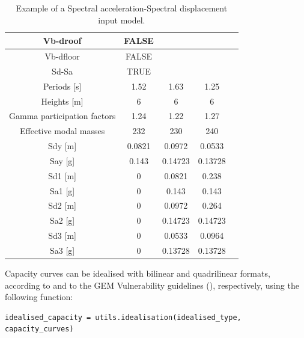 \begin {table}[htb]
\caption{Example of a Spectral acceleration-Spectral displacement input model.}
\label{table:Sa-Sd_input}
\begin{center}
  \begin{tabular}{ | c | c | c | c | c |}
  \hline
	Vb-droof &	FALSE & &  \\ \hline
	Vb-dfloor & 	FALSE & & \\ \hline
	Sd-Sa &	TRUE & & \\ \hline
	Periods [s] &	1.52 &	1.63 &	1.25 \\ \hline
	Heights [m]	& 6 &	6	& 6 \\ \hline
	Gamma participation factors	& 1.24 &	1.22 &	1.27 \\ \hline
	Effective modal masses	& 232 &	230 &	240 \\ \hline
	Sdy [m] & 	0.0821 & 	0.0972 &	0.0533\\ \hline
	Say [g]	& 0.143	& 0.14723	& 0.13728 \\ \hline
	Sd1 [m]	& 0 &	0.0821	& 0.238 \\ \hline
	Sa1 [g]	& 0	& 0.143	& 0.143 \\ \hline
	Sd2 [m] &	0 & 0.0972	& 0.264 \\ \hline
	Sa2 [g]	& 0	& 0.14723	& 0.14723 \\ \hline
	Sd3 [m]	& 0	& 0.0533	& 0.0964 \\ \hline
	Sa3 [g]	& 0	& 0.13728	& 0.13728 \\ \hline
  \end{tabular}
\end{center}
\end{table}

Capacity curves can be idealised with bilinear and quadrilinear formats, according to \citep{FEMA4402005} and to the GEM Vulnerability guidelines (\citep{Dayala2014}), respectively, using the following function:

\begin{Verbatim}[frame=single, commandchars=\\\{\}, samepage=true]
idealised_capacity = utils.idealisation(idealised_type, capacity_curves)
\end{Verbatim}